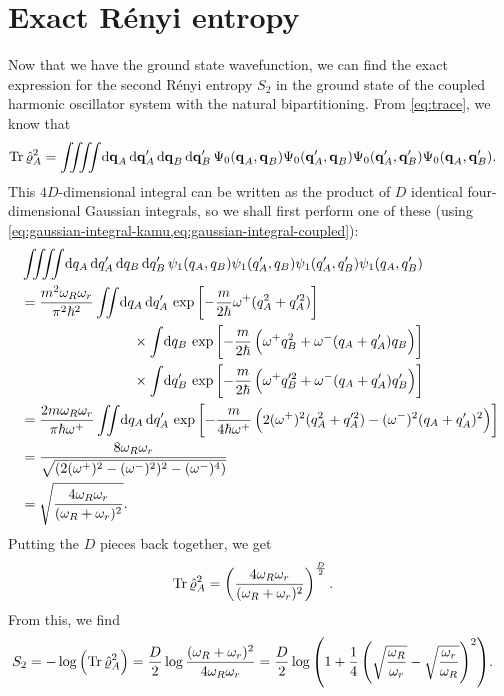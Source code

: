 \section{Exact Rényi entropy}

Now that we have the ground state wavefunction, we can find the exact expression for the second Rényi entropy $S_2$ in the ground state of the coupled harmonic oscillator system with the natural bipartitioning.
From \vref{eq:trace}, we know that
\begin{align}
	\Tr{\hat{\rho}_A^2}
	&= \iiiint\! \dif \vec{q}_A \dif \vec{q}_A' \dif \vec{q}_B \dif \vec{q}_B' \,
			\Psi_0(\vec{q}_A, \vec{q}_B) \Psi_0(\vec{q}_A', \vec{q}_B)
			\Psi_0(\vec{q}_A', \vec{q}_B') \Psi_0(\vec{q}_A, \vec{q}_B').
\end{align}
This $4 D$-dimensional integral can be written as the product of $D$ identical four-dimensional Gaussian integrals, so we shall first perform one of these (using \vref{eq:gaussian-integral-kamu,eq:gaussian-integral-coupled}):
\begin{subequations}
\begin{align}
	& \iiiint\! \dif q_A \dif q_A' \dif q_B \dif q_B' \,
			\psi_1(q_A, q_B) \psi_1(q_A', q_B) \psi_1(q_A', q_B') \psi_1(q_A, q_B') \\
	&= \frac{m^2 \omega_R \omega_r}{\pi^2 \hbar^2}
		\iint\! \dif q_A \dif q_A' \,
			\expb{-\frac{m}{2 \hbar} \omega^+ (q_A^2 + q_A'^2)} \notag \\
	&\qquad\qquad\qquad\qquad\times
			\int\! \dif q_B \,
				\expb{-\frac{m}{2 \hbar} \left(
					\omega^+ q_B^2 + \omega^- (q_A + q_A') q_B
				\right)} \notag \\
	&\qquad\qquad\qquad\qquad\times
			\int\! \dif q_B' \,
				\expb{-\frac{m}{2 \hbar} \left(
					\omega^+ q_B'^2 + \omega^- (q_A + q_A') q_B'
				\right)} \\
	&= \frac{2 m \omega_R \omega_r}{\pi \hbar \omega^+}
		\iint\! \dif q_A \dif q_A' \,
			\expb{-\frac{m}{4 \hbar \omega^+} \left( 2 (\omega^+)^2 (q_A^2 + q_A'^2) - (\omega^-)^2 (q_A + q_A')^2 \right)} \\
	&= \frac{8 \omega_R \omega_r}{\sqrt{(2 (\omega^+)^2 - (\omega^-)^2)^2 - (\omega^-)^4)}} \\
	&= \sqrt{\frac{4 \omega_R \omega_r}{(\omega_R + \omega_r)^2}}.
\end{align}
\end{subequations}
Putting the $D$ pieces back together, we get
\begin{align}
	\operatorname{Tr}{\hat{\varrho}_A^2}
	&= \left( \frac{4 \omega_R \omega_r}{(\omega_R + \omega_r)^2} \right)^\frac{D}{2}.
\end{align}
From this, we find
\begin{align}
	S_2
	&= -\log{\left( \operatorname{Tr}{\hat{\varrho}_A^2} \right)}
	= \frac{D}{2} \log{\frac{(\omega_R + \omega_r)^2}{4 \omega_R \omega_r}}
	= \frac{D}{2} \log{\left( 1 + \frac{1}{4} \left( \sqrt{\frac{\omega_R}{\omega_r}} - \sqrt{\frac{\omega_r}{\omega_R}} \right)^2 \right)}.
\end{align}


